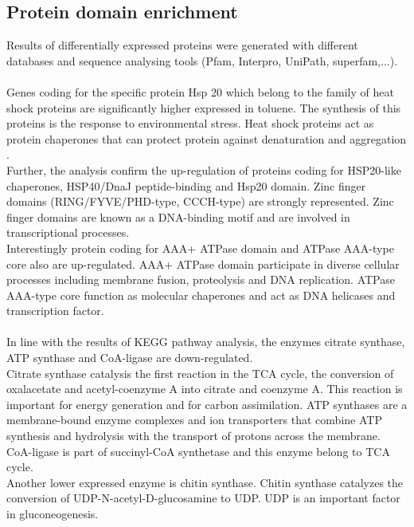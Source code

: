 \documentclass[12pt, a4paper]{report}
\begin{document}

\subsection{Protein domain enrichment}
Results of differentially expressed proteins were generated with different databases and sequence analysing tools (Pfam, Interpro, UniPath, superfam,...).\\
\ \\
Genes coding for the specific protein Hsp 20 which belong to the family of heat shock proteins are significantly higher expressed in toluene. The synthesis of this proteins is the response to environmental stress. Heat shock proteins act as protein chaperones that can protect protein against denaturation and aggregation \cite{Lindquist1988, Maaroufi2013}. \\
Further, the analysis confirm the up-regulation of proteins coding for HSP20-like chaperones, HSP40/DnaJ peptide-binding and Hsp20 domain. Zinc finger domains (RING/FYVE/PHD-type, CCCH-type) are strongly represented. Zinc finger domains are known as a DNA-binding motif and are involved in transcriptional processes.\\
Interestingly protein coding for AAA+ ATPase domain and ATPase  AAA-type core also are up-regulated. AAA+ ATPase domain participate in diverse cellular processes including membrane fusion, proteolysis and DNA replication. ATPase  AAA-type core function as molecular chaperones and act as DNA helicases and transcription factor.\\
\ \\
In line with the results of KEGG pathway analysis, the enzymes citrate synthase, ATP synthase and CoA-ligase are down-regulated. \\
Citrate synthase catalysis the first reaction in the TCA cycle, the conversion of oxalacetate and acetyl-coenzyme A into citrate and coenzyme A. This reaction is important for energy generation and for carbon assimilation. ATP synthases are a membrane-bound enzyme complexes and ion transporters that combine ATP synthesis and hydrolysis with the transport of protons across the membrane. CoA-ligase is part of succinyl-CoA synthetase and this enzyme belong to TCA cycle. \\
Another lower expressed enzyme is chitin synthase. Chitin synthase catalyzes the conversion of UDP-N-acetyl-D-glucosamine to UDP. UDP is an important factor in gluconeogenesis. \\
\end{document}
